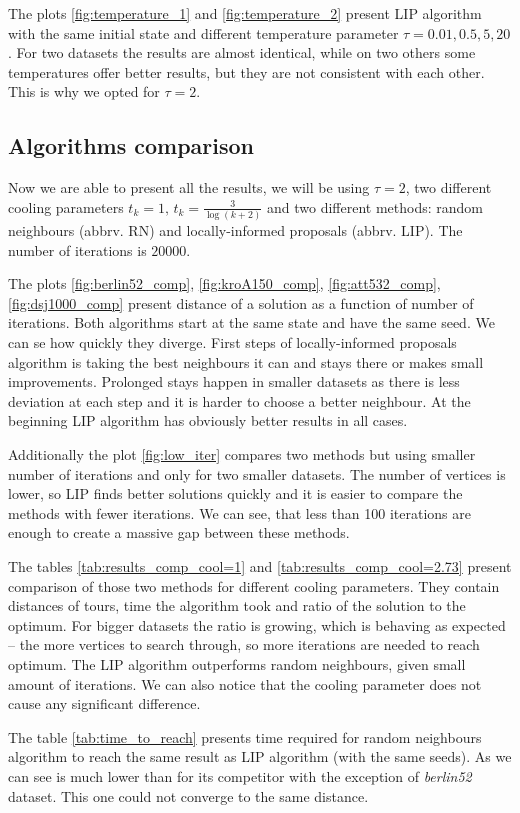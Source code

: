 	
	
	The plots \ref{fig:temperature_1} and \ref{fig:temperature_2} present LIP algorithm with the same initial state and different temperature parameter $\tau=0.01, 0.5, 5, 20$. For two datasets the results are almost identical, while on two others some temperatures offer better results, but they are not consistent with each other. This is why we opted for $\tau=2$.
	
\subsection{Algorithms comparison}
	Now we are able to present all the results, we will be using $\tau=2$, two different cooling parameters $t_k=1, \, t_k=\frac{3}{\log(k+2)}$ and two different methods: random neighbours (abbrv. RN) and locally-informed proposals (abbrv. LIP). The number of iterations is $20000$.
	
	
	
	The plots \ref{fig:berlin52_comp}, \ref{fig:kroA150_comp}, \ref{fig:att532_comp}, \ref{fig:dsj1000_comp} present distance of a solution as a function of number of iterations. Both algorithms start at the same state and have the same seed. We can se how quickly they diverge. First steps of locally-informed proposals algorithm is taking the best neighbours it can and stays there or makes small improvements. Prolonged stays happen in smaller datasets as there is less deviation at each step and it is harder to choose a better neighbour. At the beginning LIP algorithm has obviously better results in all cases.
	
	Additionally the plot \ref{fig:low_iter} compares two methods but using smaller number of iterations and only for two smaller datasets. The number of vertices is lower, so LIP finds better solutions quickly and it is easier to compare the methods with fewer iterations. We can see, that less than 100 iterations are enough to create a massive gap between these methods.
	
	
	
	The tables \ref{tab:results_comp_cool=1} and \ref{tab:results_comp_cool=2.73} present comparison of those two methods for different cooling parameters. They contain distances of tours, time the algorithm took and ratio of the solution to the optimum. For bigger datasets the ratio is growing, which is behaving as expected -- the more vertices to search through, so more iterations are needed to reach optimum. The LIP algorithm outperforms random neighbours, given small amount of iterations. We can also notice that the cooling parameter does not cause any significant difference.
	
	
	
	The table \ref{tab:time_to_reach} presents time required for random neighbours algorithm to reach the same result as LIP algorithm (with the same seeds). As we can see is much lower than for its competitor with the exception of \textit{berlin52} dataset. This one could not converge to the same distance.